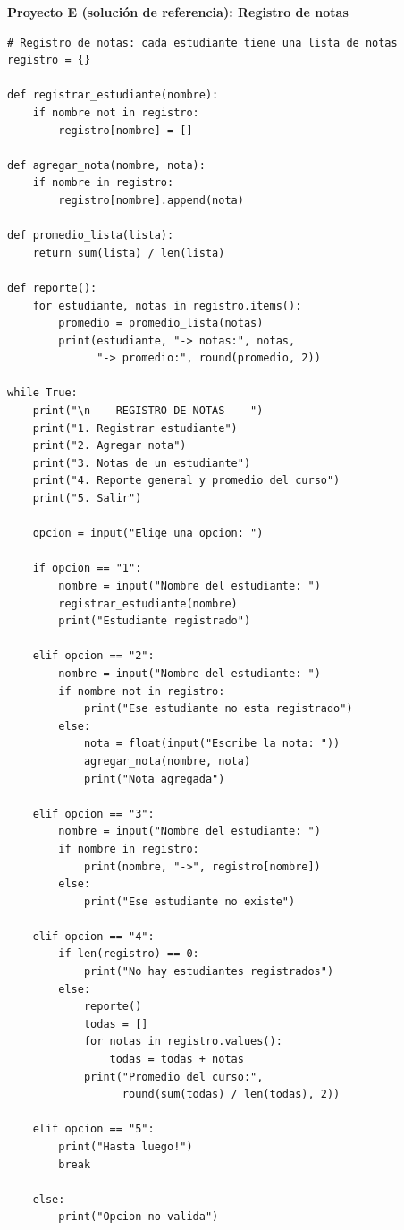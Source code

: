 \documentclass[12pt,a4paper]{article}
\begin{document}
\begin{cajaSolucion}
\textbf{Proyecto E (solución de referencia): Registro de notas}

\begin{lstlisting}[style=pythonStyle]
# Registro de notas: cada estudiante tiene una lista de notas
registro = {}

def registrar_estudiante(nombre):
    if nombre not in registro:
        registro[nombre] = []

def agregar_nota(nombre, nota):
    if nombre in registro:
        registro[nombre].append(nota)

def promedio_lista(lista):
    return sum(lista) / len(lista)

def reporte():
    for estudiante, notas in registro.items():
        promedio = promedio_lista(notas)
        print(estudiante, "-> notas:", notas,
              "-> promedio:", round(promedio, 2))

while True:
    print("\n--- REGISTRO DE NOTAS ---")
    print("1. Registrar estudiante")
    print("2. Agregar nota")
    print("3. Notas de un estudiante")
    print("4. Reporte general y promedio del curso")
    print("5. Salir")

    opcion = input("Elige una opcion: ")

    if opcion == "1":
        nombre = input("Nombre del estudiante: ")
        registrar_estudiante(nombre)
        print("Estudiante registrado")

    elif opcion == "2":
        nombre = input("Nombre del estudiante: ")
        if nombre not in registro:
            print("Ese estudiante no esta registrado")
        else:
            nota = float(input("Escribe la nota: "))
            agregar_nota(nombre, nota)
            print("Nota agregada")

    elif opcion == "3":
        nombre = input("Nombre del estudiante: ")
        if nombre in registro:
            print(nombre, "->", registro[nombre])
        else:
            print("Ese estudiante no existe")

    elif opcion == "4":
        if len(registro) == 0:
            print("No hay estudiantes registrados")
        else:
            reporte()
            todas = []
            for notas in registro.values():
                todas = todas + notas
            print("Promedio del curso:",
                  round(sum(todas) / len(todas), 2))

    elif opcion == "5":
        print("Hasta luego!")
        break

    else:
        print("Opcion no valida")
\end{lstlisting}
\end{cajaSolucion}
\end{document}
